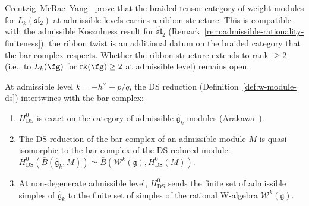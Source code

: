 \begin{remark}
\label{rem:ribbon-admissible}
Creutzig--McRae--Yang~\cite{Creutzig24} prove that the braided tensor
category of weight modules for $L_k(\mathfrak{sl}_2)$ at admissible
levels carries a ribbon structure. This is compatible with the
admissible Koszulness result for $\widehat{\mathfrak{sl}}_2$
(Remark~\ref{rem:admissible-rationality-finiteness}): the ribbon
twist is an additional datum on the braided category that the bar
complex respects. Whether the ribbon structure extends to rank
$\geq 2$ (i.e., to $L_k(\fg)$ for $\mathrm{rk}(\fg) \geq 2$ at
admissible level) remains open.
\end{remark}

\begin{proposition}
\label{prop:ds-admissible}
At admissible level $k = -h^\vee + p/q$, the DS reduction
(Definition~\textup{\ref{def:w-module-ds}}) intertwines with
the bar complex\textup{:}
\begin{enumerate}[label=\textup{(\roman*)}]
\item $H^0_{\mathrm{DS}}$ is exact on the category of
 admissible $\widehat{\mathfrak{g}}_k$-modules
 \textup{(}Arakawa~\cite{Arakawa17}\textup{)}.
\item The DS reduction of the bar complex of an admissible
 module $M$ is quasi-isomorphic to the bar complex of the
 DS-reduced module\textup{:}
 $H^0_{\mathrm{DS}}(\bar{B}(\widehat{\mathfrak{g}}_k, M))
 \simeq \bar{B}(\mathcal{W}^k(\mathfrak{g}),
 H^0_{\mathrm{DS}}(M))$.
\item At non-degenerate admissible level, $H^0_{\mathrm{DS}}$
 sends the finite set of admissible simples of
 $\widehat{\mathfrak{g}}_k$ to the finite set of simples of
 the rational W-algebra $\mathcal{W}^k(\mathfrak{g})$.
\end{enumerate}
\end{proposition}

